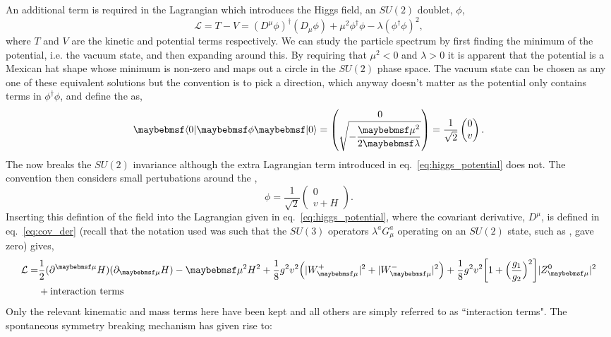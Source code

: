 An additional term is required in the \SM Lagrangian which introduces the Higgs field, an $SU(2)$ doublet, $\phi$,
\begin{equation}
  \mathcal{L} = T - V = (D^{\mu}\phi)^{\dagger}(D_{\mu}\phi) + \mu^{2}\phi^{\dagger}\phi - \lambda(\phi^{\dagger}\phi)^{2},
  \label{eq:higgs_potential}
\end{equation}
where $T$ and $V$ are the kinetic and potential terms respectively. We can study the particle spectrum by first finding the minimum of the potential, i.e. the vacuum state, and then expanding around this. By requiring that $\mu^{2}<0$ and $\lambda>0$ it is apparent that the potential is a Mexican hat shape whose minimum is non-zero and maps out a circle in the $SU(2)$ phase space. The vacuum state can be chosen as any one of these equivalent solutions but the convention is to pick a direction, which anyway doesn't matter as the potential only contains terms in $\phi^{\dagger}\phi$, and define the \VEV as,
\begin{equation}
  \bra{0}\phi\ket{0} = \begin{pmatrix} 0 \\ \sqrt{-\dfrac{\mu^{2}}{2\lambda}} \end{pmatrix} = \frac{1}{\sqrt{2}} \begin{pmatrix} 0 \\ v \end{pmatrix}.
\end{equation}
The \VEV now breaks the $SU(2)$ invariance although the extra Lagrangian term introduced in eq.~\ref{eq:higgs_potential} does not. The convention then considers small pertubations around the \VEV,
\begin{equation}
  \phi = \dfrac{1}{\sqrt{2}}\begin{pmatrix} 0 \\ v+H \end{pmatrix}.
\end{equation}
Inserting this defintion of the field \phi into the Lagrangian given in eq.~\ref{eq:higgs_potential}, where the covariant derivative, $D^{\mu}$, is defined in eq.~\ref{eq:cov_der} (recall that the notation used was such that the $SU(3)$ operators $\lambda^{a}G^{a}_{\mu}$ operating on an $SU(2)$ state, such as \phi, gave zero) gives,
\begin{align}
  \mathcal{L} = & \frac{1}{2}(\partial^{\mu}H)(\partial_{\mu}H) - \mu^{2}H^{2} + \frac{1}{8}g^{2}v^{2}\Bigl(|W_{\mu}^{+}|^{2}+|W_{\mu}^{-}|^{2}\Bigr) +\frac{1}{8}g^{2}v^{2}\biggl[1+\Bigl(\frac{g_{1}}{g_{2}}\Bigr)^{2}\biggr]|Z^{0}_{\mu}|^{2} \nonumber\\ 
  & + \mbox{interaction terms} 
\end{align}
Only the relevant kinematic and mass terms here have been kept and all others are simply referred to as ``interaction terms". The spontaneous symmetry breaking mechanism has given rise to:

